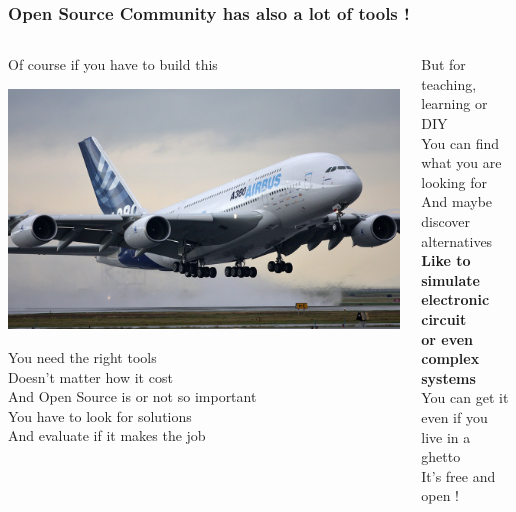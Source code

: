 \begin{frame}
  \frametitle{Open Source Community has also a lot of tools !}
  \begin{columns}[T]
    \begin{column}{.5\textwidth}
      Of course if you have to build this \\[.5em]
      \begin{center}
        \includegraphics[width=.7\textwidth]{images/airbus-land-off.jpg} \\[1em]
      \end{center}
      You need the \alert{right tools} \\
      Doesn't matter how it cost \\
      And Open Source is or not so important \\
      You have to \alert{look} for solutions \\
      And \alert{evaluate} if it makes the job
    \end{column}
    \begin{column}{.5\textwidth}
      \alert{But for teaching, learning or DIY} \\[1em]
      You can find what you are looking for \\
      And maybe discover alternatives \\[1em]
      \textbf{Like to simulate electronic circuit \\
        or even complex systems} \\[1em]
      You can get it \\
      even if you live in a ghetto \\
      It's free and open !
    \end{column}
  \end{columns}
\end{frame}

